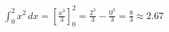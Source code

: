 \documentclass[preview]{standalone}
\begin{document}
\begin{align*}
\int_{0}^{2} x^2 \, dx = \left[ \frac{x^3}{3} \right]_{0}^{2} = \frac{2^3}{3} - \frac{0^3}{3} = \frac{8}{3} \approx 2.67
\end{align*}
\end{document}

